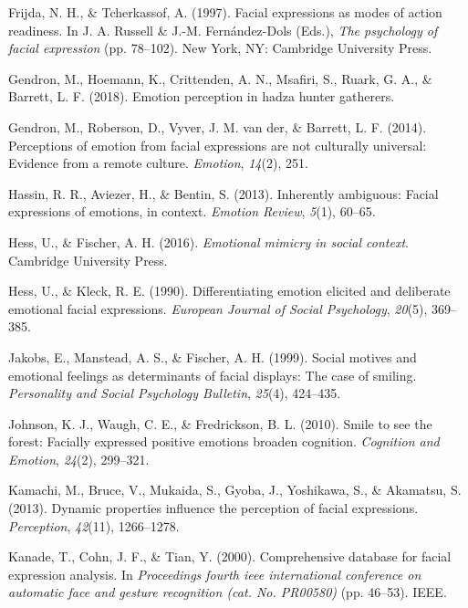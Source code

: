 \documentclass[man]{apa6}
\begin{document}
\leavevmode\hypertarget{ref-frijda1997facial}{}%
Frijda, N. H., \& Tcherkassof, A. (1997). Facial expressions as modes of action readiness. In J. A. Russell \& J.-M. Fernández-Dols (Eds.), \emph{The psychology of facial expression} (pp. 78--102). New York, NY: Cambridge University Press.

\leavevmode\hypertarget{ref-gendron2018emotion}{}%
Gendron, M., Hoemann, K., Crittenden, A. N., Msafiri, S., Ruark, G. A., \& Barrett, L. F. (2018). Emotion perception in hadza hunter gatherers.

\leavevmode\hypertarget{ref-gendron2014perceptions}{}%
Gendron, M., Roberson, D., Vyver, J. M. van der, \& Barrett, L. F. (2014). Perceptions of emotion from facial expressions are not culturally universal: Evidence from a remote culture. \emph{Emotion}, \emph{14}(2), 251.

\leavevmode\hypertarget{ref-hassin2013inherently}{}%
Hassin, R. R., Aviezer, H., \& Bentin, S. (2013). Inherently ambiguous: Facial expressions of emotions, in context. \emph{Emotion Review}, \emph{5}(1), 60--65.

\leavevmode\hypertarget{ref-hess2016emotional}{}%
Hess, U., \& Fischer, A. H. (2016). \emph{Emotional mimicry in social context}. Cambridge University Press.

\leavevmode\hypertarget{ref-hess1990differentiating}{}%
Hess, U., \& Kleck, R. E. (1990). Differentiating emotion elicited and deliberate emotional facial expressions. \emph{European Journal of Social Psychology}, \emph{20}(5), 369--385.

\leavevmode\hypertarget{ref-jakobs1999social}{}%
Jakobs, E., Manstead, A. S., \& Fischer, A. H. (1999). Social motives and emotional feelings as determinants of facial displays: The case of smiling. \emph{Personality and Social Psychology Bulletin}, \emph{25}(4), 424--435.

\leavevmode\hypertarget{ref-johnson2010smile}{}%
Johnson, K. J., Waugh, C. E., \& Fredrickson, B. L. (2010). Smile to see the forest: Facially expressed positive emotions broaden cognition. \emph{Cognition and Emotion}, \emph{24}(2), 299--321.

\leavevmode\hypertarget{ref-kamachi2013dynamic}{}%
Kamachi, M., Bruce, V., Mukaida, S., Gyoba, J., Yoshikawa, S., \& Akamatsu, S. (2013). Dynamic properties influence the perception of facial expressions. \emph{Perception}, \emph{42}(11), 1266--1278.

\leavevmode\hypertarget{ref-kanade2000comprehensive}{}%
Kanade, T., Cohn, J. F., \& Tian, Y. (2000). Comprehensive database for facial expression analysis. In \emph{Proceedings fourth ieee international conference on automatic face and gesture recognition (cat. No. PR00580)} (pp. 46--53). IEEE.
\end{document}
